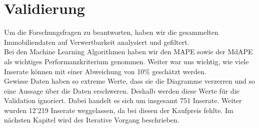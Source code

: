 \section{Validierung}
Um die Forschungsfragen zu beantworten, haben wir die gesammelten Immobiliendaten auf Verwertbarkeit analysiert und gefiltert.\\
Bei den Machine Learning Algorithmen haben wir den MAPE sowie der MdAPE als wichtiges Performanzkriterium genommen. Weiter war uns wichtig, wie viele Inserate können mit einer Abweichung von 10\% geschätzt werden.\\
Gewisse Daten haben so extreme Werte, dass sie die Diagramme verzerren und so eine Aussage über die Daten erschweren. Deshalb werden diese Werte für die Validation ignoriert. Dabei handelt es sich um insgesamt 751 Inserate. Weiter wurden 12’219 Inserate weggelassen, da bei diesen der Kaufpreis fehlte.
Im nächsten Kapitel wird der Iterative Vorgang beschrieben.
%
